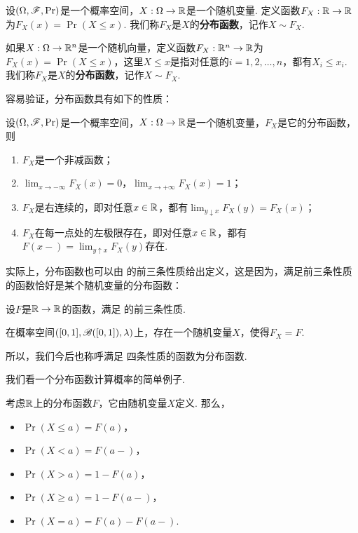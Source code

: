 \begin{definition}[分布函数]
设$(\Omega,\mathscr{F},\Pr)$是一个概率空间，$X:\Omega\to\mathbb{R}$是一个随机变量. 定义函数$F_X:\mathbb{R}\to\mathbb{R}$为$F_X(x) = \Pr(X\leq x)$. 我们称$F_X$是$X$的\textbf{分布函数}，记作$X\sim F_X$.

如果$X:\Omega\to\mathbb{R}^n$是一个随机向量，定义函数$F_X:\mathbb{R}^n\to\mathbb{R}$为$F_X(x) = \Pr(X\leq x)$，这里$X\leq x$是指对任意的$i=1,2,\ldots,n$，都有$X_i\leq x_i$. 我们称$F_X$是$X$的\textbf{分布函数}，记作$X\sim F_X$.
\end{definition}

容易验证，分布函数具有如下的性质：

\begin{proposition}\label{prop:distribution-function}
设$(\Omega,\mathscr{F},\Pr)$是一个概率空间，$X:\Omega\to\mathbb{R}$是一个随机变量，$F_X$是它的分布函数，则
\begin{enumerate}
    \item $F_X$是一个非减函数；
    \item $\lim_{x\to-\infty}F_X(x)=0$，$\lim_{x\to+\infty}F_X(x)=1$；
    \item $F_X$是右连续的，即对任意$x\in\mathbb{R}$，都有$\lim_{y\downarrow x}F_X(y)=F_X(x)$；
    \item $F_X$在每一点处的左极限存在，即对任意$x\in\mathbb{R}$，都有$F(x-)=\lim_{y\uparrow x}F_X(y)$存在.
\end{enumerate}
\end{proposition}

实际上，分布函数也可以由 的前三条性质给出定义，这是因为，满足前三条性质的函数恰好是某个随机变量的分布函数：

\begin{theorem}\label{thm:distribution-function}
设$F$是$\mathbb{R}\to\mathbb{R}$的函数，满足 的前三条性质. 

在概率空间$([0,1],\mathscr{B}([0,1]),\lambda)$上，存在一个随机变量$X$，使得$F_X=F$.
\end{theorem}

所以，我们今后也称呼满足 四条性质的函数为分布函数. 

我们看一个分布函数计算概率的简单例子. 
\begin{example}\label{ex:distribution-prob}
    考虑$\mathbb{R}$上的分布函数$F$，它由随机变量$X$定义. 那么，
    \begin{itemize}
        \item $\Pr(X\leq a)=F(a)$，
        \item $\Pr(X<a)=F(a-)$，
        \item $\Pr(X>a)=1-F(a)$，
        \item $\Pr(X\geq a)=1-F(a-)$，
        \item $\Pr(X=a)=F(a)-F(a-)$. 
    \end{itemize}
    \end{example}

